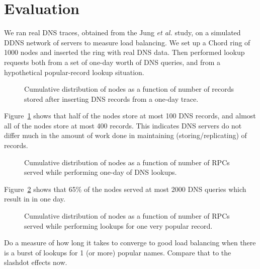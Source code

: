 \section{Evaluation}

We ran real DNS traces, obtained from the Jung {\it et al.} study,
on a simulated DDNS network
of servers to measure load balancing. We set up a
Chord ring of 1000 nodes and inserted the ring with 
real DNS data. Then performed lookup requests both
from a set of one-day worth of DNS queries, and 
from a hypothetical popular-record lookup situation.

\begin{figure}
\caption{Cumulative distribution of nodes as a function of number 
of records stored after inserting DNS records from a one-day trace.}
\label{fig:store}
\end{figure}

Figure~\ref{fig:store} shows that half of the nodes
store at most 100 DNS records, and almost all of 
the nodes store at most 400 records. This indicates
DNS servers do not differ much in the amount of work
done in maintaining (storing/replicating) of records.

\begin{figure}
\caption{Cumulative distribution of nodes as a function of number 
of RPCs served while performing one-day of DNS lookups.}
\label{fig:both-rpc}
\end{figure}

Figure~\ref{fig:both-rpc} shows that 65\% of the nodes
served at most 2000 DNS queries which result in  in one day.

\begin{figure}
\caption{Cumulative distribution of nodes as a function of number 
of RPCs served while performing lookups for one very
popular record.}
\label{fig:slashdot-rpc}
\end{figure}

Do a measure of how long it takes to converge to good load 
balancing when there is a burst of lookups for 1 (or more)
popular names. Compare that to the slashdot effects now.




